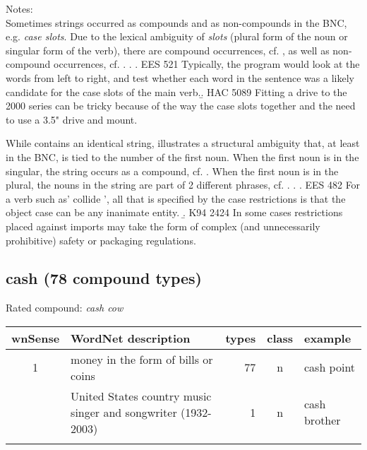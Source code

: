 \noindent
Notes:\\
Sometimes strings occurred as compounds and as non-compounds in the BNC, e.g. \emph{case slots}. Due to the lexical ambiguity of \emph{slots} (plural form of the noun or singular form of the verb), there are compound occurrences, cf. \Next[a], as well as non-compound occurrences, cf. \Next[b].  
\ex. \a. EES 521 Typically, the program would look at the words from left to right, and test whether each word in the sentence was a likely candidate for the case slots of the main verb.\pagebreak[4]
\b. HAC 5089 Fitting a drive to the 2000 series can be tricky because of the way the case slots together and the need to use a 3.5" drive and mount. 

While \Last contains an identical string, \Next illustrates a
structural ambiguity that, at least in the BNC, is tied to the number
of the first noun. When the first noun is in the singular, the string occurs as a compound, cf. \Next[a]. When the first noun is in the plural, the nouns in the string are part of 2 different phrases, cf. \Next[b].  
\ex. \a. EES 482 For a verb such as’ collide ’, all that is specified by the case restrictions is that the object case can be any inanimate entity. 
\b. K94 2424 In some cases restrictions placed against imports may take the form of complex (and unnecessarily prohibitive) safety or packaging regulations. 


\subsection{cash (78 compound types)}
Rated compound: \emph{cash cow}

\vspace*{1ex}

\noindent
\begin{longtable}{c>{\raggedright\arraybackslash}p{5cm}rc>{\raggedright\arraybackslash}p{2cm}}\lsptoprule
{\small wnSense}&WordNet description&types&class&example\\\midrule
1&money in the form of bills or coins&77&n&cash point\\\tablevspace
3&United States country music singer and songwriter (1932-2003)&1&n&cash brother\\\lspbottomrule
\end{longtable}

